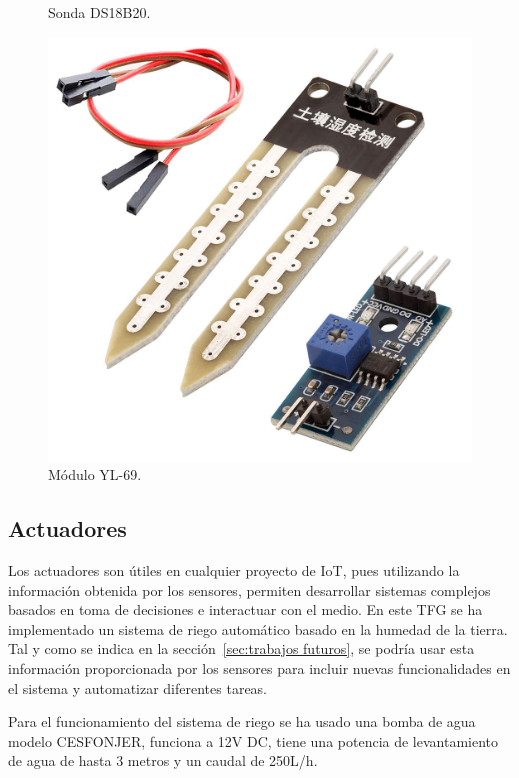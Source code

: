 \documentclass[a4paper, 12pt, oneside]{book}
\begin{document}
\begin{figure}[H]
\begin{minipage}[b]{0.4\textwidth}
    \caption{Sonda DS18B20.}
    \label{figura:sonda_ds18b20}
  \end{minipage}
  \hfill
    \begin{minipage}[b]{0.4\textwidth}
    \includegraphics[width=\textwidth]{img/yl-69}
    \caption{Módulo YL-69.}
    \label{figura:yl_69}
  \end{minipage}
\end{figure}

\subsection{Actuadores}
\label{subsec:actuadores}

Los actuadores son útiles en cualquier proyecto de IoT, pues utilizando la información obtenida por los sensores, permiten desarrollar sistemas complejos basados en toma de decisiones e interactuar con el medio. 
En este TFG se ha implementado un sistema de riego automático basado en la humedad de la tierra. Tal y como se indica en la sección~\ref{sec:trabajos futuros}, se podría usar esta información proporcionada por los sensores para incluir nuevas funcionalidades en el sistema y automatizar diferentes tareas.

Para el funcionamiento del sistema de riego se ha usado una bomba de agua modelo CESFONJER, funciona a 12V DC, tiene una potencia de levantamiento de agua de hasta 3 metros y un caudal de 250L/h.
\end{document}
